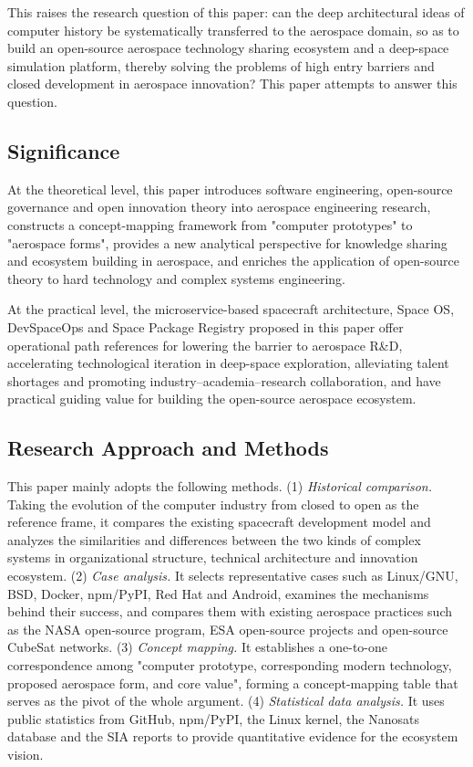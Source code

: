 \documentclass[11pt]{article}
\begin{document}
This raises the research question of this paper: can the deep architectural ideas of computer history be systematically transferred to the aerospace domain, so as to build an open-source aerospace technology sharing ecosystem and a deep-space simulation platform, thereby solving the problems of high entry barriers and closed development in aerospace innovation? This paper attempts to answer this question.

\subsection{Significance}
At the theoretical level, this paper introduces software engineering, open-source governance and open innovation theory into aerospace engineering research, constructs a concept-mapping framework from "computer prototypes" to "aerospace forms", provides a new analytical perspective for knowledge sharing and ecosystem building in aerospace, and enriches the application of open-source theory to hard technology and complex systems engineering.

At the practical level, the microservice-based spacecraft architecture, Space OS, DevSpaceOps and Space Package Registry proposed in this paper offer operational path references for lowering the barrier to aerospace R\&D, accelerating technological iteration in deep-space exploration, alleviating talent shortages and promoting industry--academia--research collaboration, and have practical guiding value for building the open-source aerospace ecosystem.

\subsection{Research Approach and Methods}
This paper mainly adopts the following methods. (1) \emph{Historical comparison.} Taking the evolution of the computer industry from closed to open as the reference frame, it compares the existing spacecraft development model and analyzes the similarities and differences between the two kinds of complex systems in organizational structure, technical architecture and innovation ecosystem. (2) \emph{Case analysis.} It selects representative cases such as Linux/GNU, BSD, Docker, npm/PyPI, Red Hat and Android, examines the mechanisms behind their success, and compares them with existing aerospace practices such as the NASA open-source program, ESA open-source projects and open-source CubeSat networks. (3) \emph{Concept mapping.} It establishes a one-to-one correspondence among "computer prototype, corresponding modern technology, proposed aerospace form, and core value", forming a concept-mapping table that serves as the pivot of the whole argument. (4) \emph{Statistical data analysis.} It uses public statistics from GitHub, npm/PyPI, the Linux kernel, the Nanosats database and the SIA reports to provide quantitative evidence for the ecosystem vision.
\end{document}
